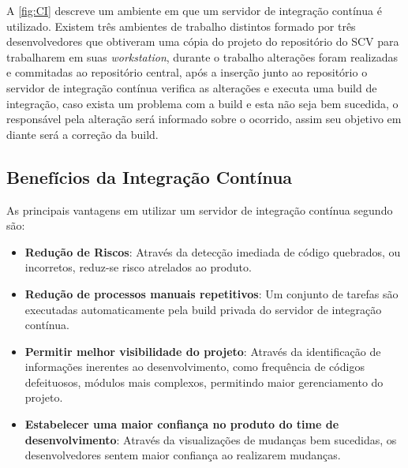 A \autoref{fig:CI} descreve um ambiente em que um servidor de integração contínua é utilizado. Existem três ambientes de trabalho distintos formado por três desenvolvedores que obtiveram uma cópia do projeto do repositório do SCV para trabalharem em suas \textit{workstation}, durante o trabalho alterações foram realizadas e commitadas ao repositório central, após a inserção junto ao repositório o servidor de integração contínua verifica as alterações e executa uma build de integração,  caso exista um problema com a build e esta não seja bem sucedida, o responsável pela alteração será informado sobre o ocorrido, assim seu objetivo em diante será a correção da build.

\subsection{Benefícios da Integração Contínua}

As principais vantagens em utilizar um servidor de integração contínua segundo  são:

\begin{itemize}
\item {\textbf{Redução de Riscos}}: 
Através da detecção imediada de código quebrados, ou incorretos, reduz-se risco atrelados ao produto.
\item {\textbf{Redução de processos manuais repetitivos}}:
Um conjunto de tarefas são executadas automaticamente pela build privada do servidor de integração contínua.
\item {\textbf{Permitir melhor visibilidade do projeto}}:
Através da identificação de informações inerentes ao desenvolvimento, como frequência de códigos defeituosos, módulos mais complexos, permitindo maior gerenciamento do projeto.
\item {\textbf{Estabelecer uma maior confiança no produto do time de desenvolvimento}}:
Através da visualizações de mudanças bem sucedidas, os desenvolvedores sentem maior confiança ao realizarem mudanças.
\end{itemize}

